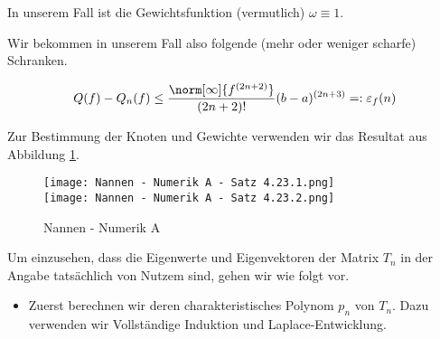 \begin{solution}

In unserem Fall ist die Gewichtsfunktion (vermutlich) $\omega \equiv 1$.


Wir bekommen in unserem Fall also folgende (mehr oder weniger scharfe) Schranken.

\begin{align*}
  Q(f) - Q_n(f)
  \leq
  \frac
  {
    \norm[\infty]{f^{(2n+2)}}
  }{
    (2n + 2)!
  }
  (b - a)^{(2n+3)}
  =:
  \varepsilon_f(n)
\end{align*}

Zur Bestimmung der Knoten und Gewichte verwenden wir das Resultat aus Abbildung \ref{fig:NNAS4.23}.

\begin{figure}[h!]
  \begin{boxedin}
    \begin{center}
      \texttt{[image: Nannen - Numerik A - Satz 4.23.1.png]} \\
      \vspace{0.5 cm}
      \texttt{[image: Nannen - Numerik A - Satz 4.23.2.png]}
      \caption{Nannen - Numerik A}
      \label{fig:NNAS4.23}
    \end{center}
  \end{boxedin}
\end{figure}

Um einzusehen, dass die Eigenwerte und Eigenvektoren der Matrix $T_n$ in der Angabe tatsächlich von Nutzem sind, gehen wir wie folgt vor.

\begin{itemize}

  \item Zuerst berechnen wir deren charakteristisches Polynom $p_n$ von $T_n$.
  Dazu verwenden wir Vollständige Induktion und Laplace-Entwicklung.


\end{itemize}
\end{solution}
